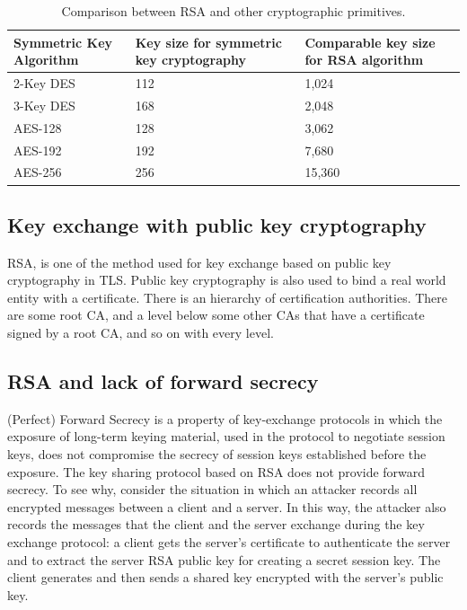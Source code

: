 \begin{table}[b]
	\centering
	\begin{tabular}{ |p{4cm}|p{4cm}|p{4cm}|  }
		\hline
		Symmetric Key Algorithm& Key size for symmetric key	cryptography &Comparable key size for RSA algorithm\\
		\hline
		2-Key DES & 112 & 1,024\\
		3-Key DES & 168 & 2,048\\
		AES-128 & 128 & 3,062\\
		AES-192 & 192 & 7,680\\
		AES-256 & 256 & 15,360\\
		\hline			
	\end{tabular}
	\caption{Comparison between RSA and other cryptographic primitives.}
	\label{table:comparison_rsa}
\end{table}

\subsection{Key exchange with public key cryptography}

RSA, is one of the method used for key exchange based on public key cryptography in TLS. Public key cryptography is also used to bind a real world entity with a certificate.
There is an hierarchy of certification authorities. There are some root CA, and a level below some other CAs that have a certificate signed by a root CA, and so on with every level.


\subsection{RSA and lack of forward secrecy}
(Perfect) Forward Secrecy is a property of key-exchange protocols in which the exposure of long-term keying material, used in the protocol to negotiate session keys, does not compromise the secrecy of session keys established before the exposure. 
The key sharing protocol based on RSA does not provide forward secrecy. To see why, consider the situation in which an attacker records all encrypted messages between a client and a server.
In this way, the attacker also records the messages that the client and the server exchange during the key exchange protocol: a client gets the server’s certificate to authenticate the server and to extract the server RSA public key for creating a secret session key. The client generates and then sends a shared key encrypted with the server’s public key.

